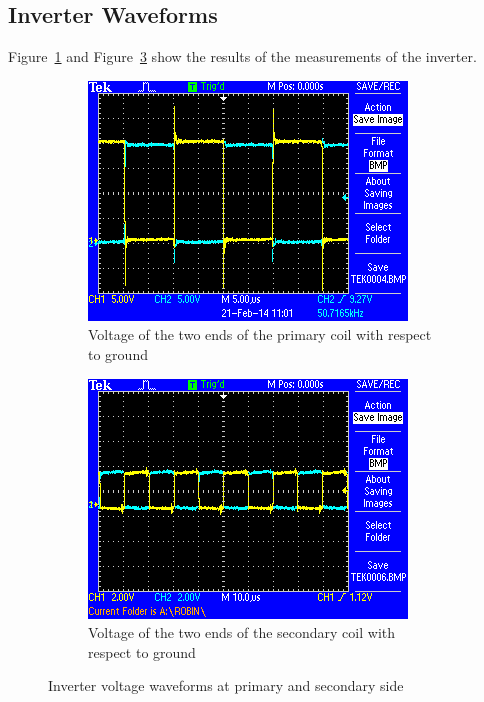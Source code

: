 \documentclass[11pt,titlepage]{report}
\begin{document}
\begin{appendices}
\subsection{Inverter Waveforms}
Figure~\ref{fig:app-osc-coil-primary} and Figure~\ref{fig:app-osc-coil-secondary} show the results of the measurements of the inverter.
\label{app:waveforms}
\begin{figure}[H]
	\begin{center}
		\begin{subfigure}[h]{0.48\textwidth}
			\includegraphics[width=\textwidth]{resource/osc-coil-primary.png}
			\caption{Voltage of the two ends of the primary coil with respect to ground}
			\label{fig:app-osc-coil-primary}
		\end{subfigure}
		\quad
		\begin{subfigure}[h]{0.48\textwidth}
			\includegraphics[width=\textwidth]{resource/osc-coil-secondary.png}
			\caption{Voltage of the two ends of the secondary coil with respect to ground}
			\label{fig:app-osc-coil-secondary}
		\end{subfigure}
	\end{center}
	\caption{Inverter voltage waveforms at primary and secondary side}
\end{figure}





\end{appendices}
\end{document}

